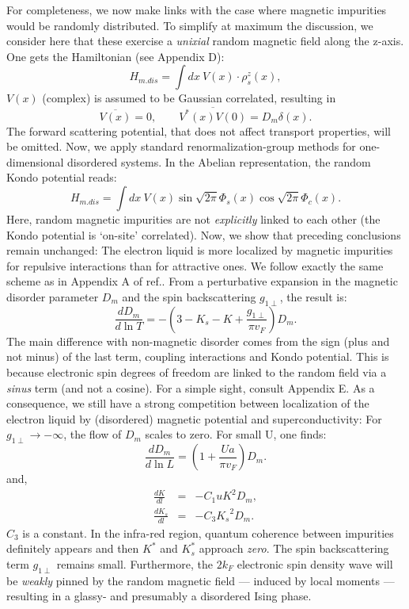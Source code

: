 For completeness, we now make links with the case where magnetic impurities
would be randomly distributed. To simplify at
maximum the discussion, we consider here
that these exercise 
a {\it unixial} random magnetic field along the
z-axis. One gets the Hamiltonian (see Appendix D):
\begin{equation}
H_{m.dis}=\int dx\ V(x)\cdot\rho_s^{z}(x),
\end{equation}
$V(x)$ (complex) is assumed to be Gaussian correlated, resulting in
\begin{equation}
\overline{V(x)}=0,\qquad \overline{V^*(x)V(0)}=D_m\delta(x).
\end{equation}
The forward scattering potential, that does not affect transport properties,
will be omitted. Now, we apply standard renormalization-group methods for
one-dimensional disordered systems\cite{Giam2}. In the 
Abelian representation, the random Kondo potential reads:
\begin{equation}
H_{m.dis}=\int dx\ V(x)\sin{\sqrt{2\pi}\Phi_s(x)}\cos{\sqrt{2\pi}\Phi_c(x)}.
\end{equation}
Here, random
magnetic impurities are not {\it explicitly} linked to
each other (the Kondo potential
is `on-site' correlated). 
Now, we show that preceding conclusions
remain unchanged: The electron liquid is more localized by magnetic impurities
for repulsive interactions than for attractive ones. We follow exactly the
same scheme as in Appendix A of ref.\cite{Giam2}. 
From a perturbative expansion in the magnetic disorder 
parameter $D_m$ and the spin backscattering $g_{1\perp}$, the result is:
\begin{equation}
\frac{dD_m}{d\ln T}=-(3-K_s-K+\frac{g_{1\perp}}{\pi v_F})D_m.
\end{equation}
The main difference with non-magnetic disorder comes from the sign (plus
and not minus) of the last term, coupling interactions and Kondo
potential. This is
because electronic spin degrees of freedom are linked to the random
field via a {\it sinus} term (and not a cosine). For a simple sight, consult
Appendix E.
As a consequence, 
we still have a strong competition between localization of the electron
liquid by (disordered) magnetic potential and superconductivity: For
$g_{1\perp}\rightarrow -\infty$, the flow of $D_m$ scales to zero. 
For small U, one finds:
\begin{equation}
\frac{dD_m}{d\ln L}=(1+\frac{Ua}{\pi v_F})D_m.
\end{equation}
and,
\begin{eqnarray}
\frac{dK}{dl}&=&-C_1 uK^2D_m,\\ \nonumber
\frac{dK_s}{dl}&=&-C_3{K_s}^2 D_m.
\end{eqnarray}
$C_3$ is a constant. In the infra-red region, quantum
coherence between impurities definitely appears and then
$K^*$ and $K_s^*$ approach {\it zero}. The spin backscattering term
$g_{1\perp}$ remains small. Furthermore, 
the $2k_F$ electronic spin density wave will be {\it weakly} pinned
by the random magnetic field --- induced by local moments --- resulting in a 
glassy- and presumably a disordered Ising phase\cite{Doty-Fisher}. 

